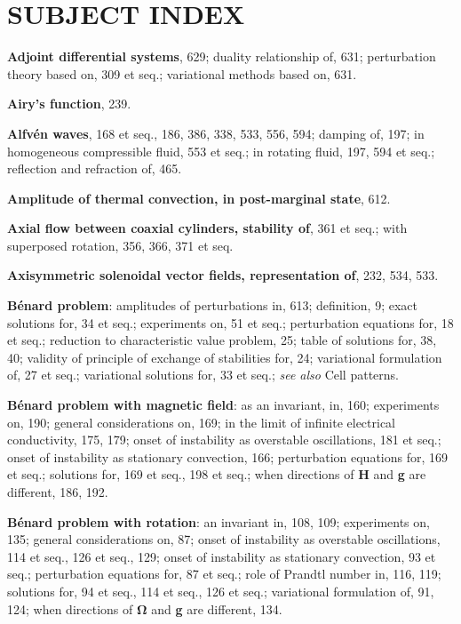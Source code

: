 \chapter*{SUBJECT INDEX}
\label{ch:subject-index}

\begin{small}
\noindent
\textbf{Adjoint differential systems}, 629;
  duality relationship of, 631;
  perturbation theory based on, 309 et seq.;
  variational methods based on, 631.

\medskip\noindent
\textbf{Airy's function}, 239.

\medskip\noindent
\textbf{Alfv\'en waves}, 168 et seq., 186, 386, 338,
  533, 556, 594;
  damping of, 197;
  in homogeneous compressible fluid, 553
    et seq.;
  in rotating fluid, 197, 594 et seq.;
  reflection and refraction of, 465.

\medskip\noindent
\textbf{Amplitude of thermal convection, in post-marginal state}, 612.

\medskip\noindent
\textbf{Axial flow between coaxial cylinders, stability of}, 361 et seq.;
  with superposed rotation, 356, 366, 371
    et seq.

\medskip\noindent
\textbf{Axisymmetric solenoidal vector fields, representation of}, 232, 534, 533.

\bigskip\noindent
\textbf{B\'enard problem}:
  amplitudes of perturbations in, 613;
  definition, 9;
  exact solutions for, 34 et seq.;
  experiments on, 51 et seq.;
  perturbation equations for, 18 et seq.;
  reduction to characteristic value problem, 25;
  table of solutions for, 38, 40;
  validity of principle of exchange of
    stabilities for, 24;
  variational formulation of, 27 et seq.;
  variational solutions for, 33 et seq.;
  \textit{see also} Cell patterns.

\medskip\noindent
\textbf{B\'enard problem with magnetic field}:
  as an invariant, in, 160;
  experiments on, 190;
  general considerations on, 169;
  in the limit of infinite electrical conductivity, 175, 179;
  onset of instability as overstable oscillations, 181 et seq.;
  onset of instability as stationary convection, 166;
  perturbation equations for, 169 et seq.;
  solutions for, 169 et seq., 198 et seq.;
  when directions of \textbf{H} and \textbf{g} are different,
    186, 192.

\medskip\noindent
\textbf{B\'enard problem with rotation}:
  an invariant in, 108, 109;
  experiments on, 135;
  general considerations on, 87;
  onset of instability as overstable oscillations, 114 et seq., 126 et seq., 129;
  onset of instability as stationary convection, 93 et seq.;
  perturbation equations for, 87 et seq.;
  role of Prandtl number in, 116, 119;
  solutions for, 94 et seq., 114 et seq., 126
    et seq.;
  variational formulation of, 91, 124;
  when directions of $\boldsymbol{\Omega}$ and \textbf{g} are different,
    134.


\end{small}

